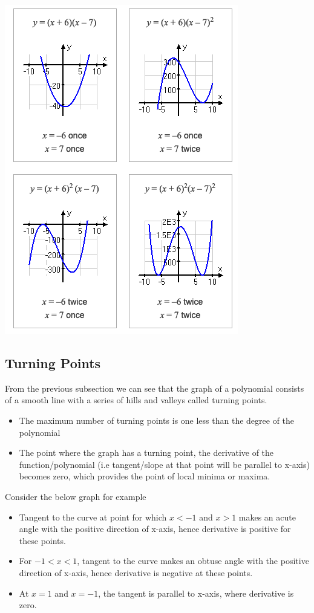 \documentclass{book}
\begin{document}
	\includegraphics[scale=0.7]{zerom}
	
	\subsection{Turning Points}
	From the previous subsection we can see that the graph of a polynomial consists of a smooth line with a series of hills and valleys called turning points. 
	\begin{itemize}
		\item The maximum number of turning points is one less than the degree of the polynomial
		\item The point where the graph has a turning point, the derivative of the function/polynomial (i.e tangent/slope at that point will be parallel to x-axis) becomes zero, which provides the point of local minima or maxima.
	\end{itemize}
	
	Consider the below graph for example
	
	\begin{itemize}
		
		\item Tangent to the curve at point for which $x < -1$ and $x > 1$ makes an acute angle with the positive direction of x-axis, hence derivative is positive for these points.
		\item For $-1 < x < 1$, tangent to the curve makes an obtuse angle with the positive direction of x-axis, hence derivative is negative at these points.
		\item At $x=1$ and $x=-1$, the tangent is parallel to x-axis, where derivative is zero.
	\end{itemize}
	
\end{document}
